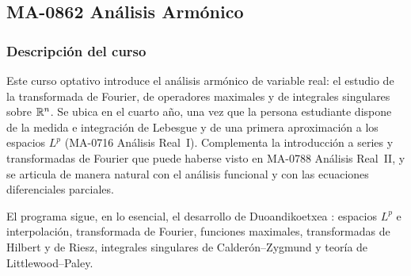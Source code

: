 \newpage
\subsection*{MA-0862 Análisis Armónico}

\hypertarget{MA0862}{}
\begin{refsection}
\begin{table}[H]
\end{table}

\subsubsection*{Descripción del curso}

Este curso optativo introduce el análisis armónico de variable real: el estudio de la transformada de Fourier, de operadores maximales y de integrales singulares sobre $\mathbb{R}^n$. Se ubica en el cuarto año, una vez que la persona estudiante dispone de la medida e integración de Lebesgue y de una primera aproximación a los espacios $L^p$ (MA-0716 Análisis Real~I). Complementa la introducción a series y transformadas de Fourier que puede haberse visto en MA-0788 Análisis Real~II, y se articula de manera natural con el análisis funcional y con las ecuaciones diferenciales parciales.

El programa sigue, en lo esencial, el desarrollo de Duoandikoetxea \cite{Duo01}: espacios $L^p$ e interpolación, transformada de Fourier, funciones maximales, transformadas de Hilbert y de Riesz, integrales singulares de Calderón--Zygmund y teoría de Littlewood--Paley.


\end{refsection}
